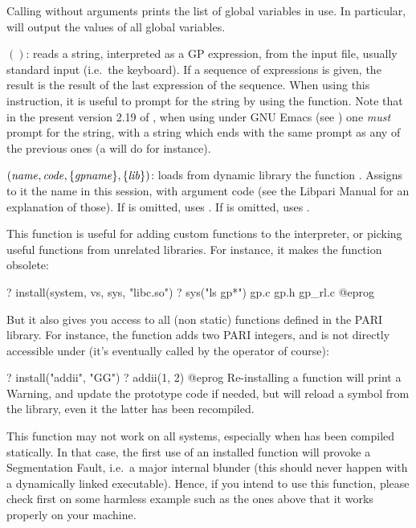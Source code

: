 Calling  without arguments prints the list of global variables in
use. In particular,  will output the values of all global
variables.

$()$: reads a string, interpreted as a GP expression,
from the input file, usually standard input (i.e.~the keyboard). If a
sequence of expressions is given, the result is the result of the last
expression of the sequence. When using this instruction, it is useful to
prompt for the string by using the  function. Note that in the
present version 2.19 of , when using  under GNU Emacs (see
) one \emph{must} prompt for the string, with a string
which ends with the same prompt as any of the previous ones (a 
will do for instance).

$(\hbox{\it name\/},\hbox{\it code\/},\{\hbox{\it gpname\/}\},\{\hbox{\it lib\/}\})$:
loads from dynamic library  the function . Assigns to it
the name  in this  session, with argument code 
(see the Libpari Manual for an explanation of those). If  is
omitted, uses . If  is omitted, uses
.\label{se:install}

This function is useful for adding custom functions to the  interpreter,
or picking useful functions from unrelated libraries. For instance, it
makes the function  obsolete:

\bprog
? install(system, vs, sys, "libc.so")
? sys("ls gp*")
gp.c            gp.h            gp_rl.c
@eprog

But it also gives you access to all (non static) functions defined in the
PARI library. For instance, the function  adds
two PARI integers, and is not directly accessible under  (it's eventually
called by the \kbd{+} operator of course):

\bprog
? install("addii", "GG")
? addii(1, 2)
@eprog\noindent
Re-installing a function will print a Warning, and update the prototype code
if needed, but will reload a symbol from the library, even it the latter has
been recompiled.

 This function may not work on all systems, especially
when  has been compiled statically. In that case, the first use of an
installed function will provoke a Segmentation Fault, i.e.~a major internal
blunder (this should never happen with a dynamically linked executable).
Hence, if you intend to use this function, please check first on some
harmless example such as the ones above that it works properly on your
machine.

